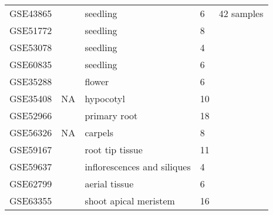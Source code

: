 \documentclass[letterpaper,12pt]{article}
\begin{document}
\begin{table}[!ht]
\begin{tabular}{p{2.5cm}p{2cm}p{4.5cm}p{1cm}p{4cm}}
			GSE43865   & \cite{rugnone2013lnk}                & seedling                                                 & 6           & 42 samples             \\
			GSE51772   & \cite{oh2014cell}                    & seedling                                                 & 8           &                        \\
			GSE53078   & \cite{fan2014bhlh}                   & seedling                                                 & 4           &                        \\
			GSE60835   & \cite{dong2014arabidopsis}           & seedling                                                 & 6           &                        \\  \hline
			GSE35288   & \cite{niederhuth2013transcriptional} & flower                                                   & 6           &                        \\
			GSE35408   & NA                            & hypocotyl                                                & 10          &                        \\
			GSE52966   & \cite{chaiwanon2015spatiotemporal}   & primary root                                             & 18          &                        \\
			GSE56326   & NA                            & carpels  & 8           &                        \\
			GSE59167   & \cite{pallakies2014cle40}            & root tip tissue                                          & 11          &                        \\
			GSE59637   & \cite{mizzotti2014seedstick}         & inflorescences and siliques                              & 4           &                        \\
			GSE62799   & \cite{groth2014snf2}                 & aerial tissue                                            & 6           &                        \\
			GSE63355   & \cite{liu2015repair}                 & shoot apical meristem                                    & 16          &               \\ \hline        
		\end{tabular}
	\end{table}
	
\end{document}
